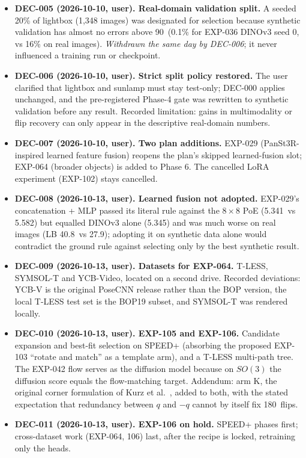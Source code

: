 \begin{itemize}
\item \textbf{DEC-005 (2026-10-10, user). Real-domain validation split.} A seeded 20\% of lightbox (1,348 images) was designated for selection because synthetic validation has almost no errors above 90\appDdeg\ (0.1\% for EXP-036 DINOv3 seed 0, vs 16\% on real images). \emph{Withdrawn the same day by DEC-006}; it never influenced a training run or checkpoint.
\item \textbf{DEC-006 (2026-10-10, user). Strict split policy restored.} The user clarified that lightbox and sunlamp must stay test-only; DEC-000 applies unchanged, and the pre-registered Phase-4 gate was rewritten to synthetic validation before any result. Recorded limitation: gains in multimodality or flip recovery can only appear in the descriptive real-domain numbers.
\item \textbf{DEC-007 (2026-10-10, user). Two plan additions.} EXP-029 (PanSt3R-inspired learned feature fusion) reopens the plan's skipped learned-fusion slot; EXP-064 (broader objects) is added to Phase 6. The cancelled LoRA experiment (EXP-102) stays cancelled.
\item \textbf{DEC-008 (2026-10-13, user). Learned fusion not adopted.} EXP-029's concatenation + MLP passed its literal rule against the $8\times8$ PoE (5.341\appDdeg\ vs 5.582\appDdeg) but equalled DINOv3 alone (5.345\appDdeg) and was much worse on real images (LB 40.8\appDdeg\ vs 27.9\appDdeg); adopting it on synthetic data alone would contradict the ground rule against selecting only by the best synthetic result.
\item \textbf{DEC-009 (2026-10-13, user). Datasets for EXP-064.} T-LESS, SYMSOL-T and YCB-Video, located on a second drive. Recorded deviations: YCB-V is the original PoseCNN release rather than the BOP version, the local T-LESS test set is the BOP19 subset, and SYMSOL-T was rendered locally.
\item \textbf{DEC-010 (2026-10-13, user). EXP-105 and EXP-106.} Candidate expansion and best-fit selection on SPEED+ (absorbing the proposed EXP-103 ``rotate and match'' as a template arm), and a T-LESS multi-path tree. The EXP-042 flow serves as the diffusion model because on $SO(3)$ the diffusion score equals the flow-matching target. Addendum: arm K, the original corner formulation of Kurz et al.~\cite{kurz2017tesseract}, added to both, with the stated expectation that redundancy between $q$ and $-q$ cannot by itself fix 180\appDdeg\ flips.
\item \textbf{DEC-011 (2026-10-13, user). EXP-106 on hold.} SPEED+ phases first; cross-dataset work (EXP-064, 106) last, after the recipe is locked, retraining only the heads.

\end{itemize}
